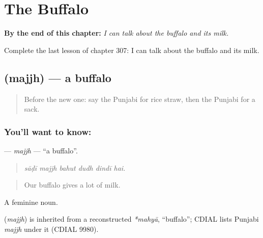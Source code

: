 
\chapter{The Buffalo}
\label{ch:pa-a2-the-buffalo}

\begin{chapteropening}
\textbf{By the end of this chapter:} \emph{I can talk about the buffalo and its milk.}

Complete the last lesson of chapter 307: I can talk about the buffalo and its milk.
\end{chapteropening}

\section[\texorpdfstring{\pa{ਮੱਝ} (majjh)}{ਮੱਝ (majjh)}]{ (majjh) — a buffalo}

\label{lesson:PA-C307-majjh}



\begin{quote}
Before the new one: say the Punjabi for rice straw, then the Punjabi for a sack.
\end{quote}

\subsection*{You'll want to know: }
\textbf{} — \emph{majjh} — \textquotedblleft{}a buffalo\textquotedblright{}.

\begin{quote}
     
\end{quote}

\begin{quote}
\emph{sāḍī majjh bahut dudh dindī hai.}
\end{quote}

\begin{quote}
Our buffalo gives a lot of milk.
\end{quote}

A feminine noun.

\begin{cousinweb}
\textbf{} (\emph{majjh}) is inherited from a reconstructed \emph{*mahyā}, \textquotedblleft{}buffalo\textquotedblright{}; CDIAL lists Punjabi \emph{majjh} under it (CDIAL 9980).
\end{cousinweb}

